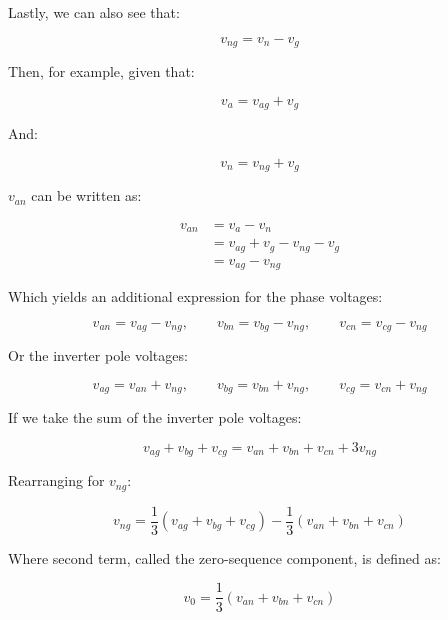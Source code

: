 \documentclass{article}
\begin{document}
Lastly, we can also see that:

\begin{equation}
    v_{ng} = v_n - v_g
\end{equation}

Then, for example, given that:

\begin{equation}
    v_a = v_{ag} + v_g
\end{equation}

And:

\begin{equation}
    v_n = v_{ng} + v_g
\end{equation}

$v_{an}$ can be written as:

\begin{align}
    v_{an} 
    &= v_a - v_n \\
    &= v_{ag} + v_g - v_{ng} - v_g \\
    &= v_{ag} - v_{ng}
\end{align}

Which yields an additional expression for the phase voltages:

\begin{equation}
    v_{an} = v_{ag} - v_{ng}, \qquad
    v_{bn} = v_{bg} - v_{ng}, \qquad
    v_{cn} = v_{cg} - v_{ng}
\end{equation}

Or the inverter pole voltages:

\begin{equation}
    v_{ag} = v_{an} + v_{ng}, \qquad
    v_{bg} = v_{bn} + v_{ng}, \qquad
    v_{cg} = v_{cn} + v_{ng}
\end{equation}

If we take the sum of the inverter pole voltages:

\begin{equation}
    v_{ag} + v_{bg} + v_{cg} = v_{an} + v_{bn} + v_{cn} + 3v_{ng}
\end{equation}

Rearranging for $v_{ng}$:

\begin{equation}
\label{eqn-v-ng}
    v_{ng} = \frac{1}{3}(v_{ag} + v_{bg} + v_{cg}) - \frac{1}{3}(v_{an} + v_{bn} + v_{cn})
\end{equation}

Where second term, called the zero-sequence component, is defined as:

\begin{equation}
    v_0 = \frac{1}{3}(v_{an} + v_{bn} + v_{cn})
\end{equation}
\end{document}
